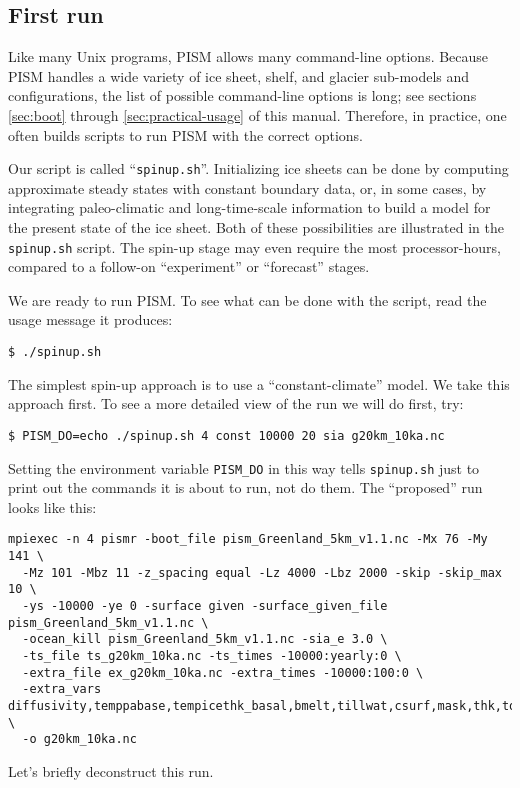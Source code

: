 \subsection{First run}   \label{subsect:runscript}  Like many Unix programs, PISM allows many command-line options.  Because PISM handles a wide variety of ice sheet, shelf, and glacier sub-models and configurations, the list of possible command-line options is long; see sections \ref{sec:boot} through \ref{sec:practical-usage} of this manual.  Therefore, in practice, one often builds scripts to run PISM with the correct options.

Our script is called ``\texttt{spinup.sh}''.  Initializing ice sheets can be done by computing approximate steady states with constant boundary data, or, in some cases, by integrating paleo-climatic and long-time-scale information to build a model for the present state of the ice sheet.  Both of these possibilities are illustrated in the \texttt{spinup.sh} script.  The spin-up stage may even require the most processor-hours, compared to a follow-on ``experiment'' or ``forecast'' stages.

We are ready to run PISM.  To see what can be done with the script, read the usage message it produces:
\begin{verbatim}
$ ./spinup.sh
\end{verbatim}

The simplest spin-up approach is to use a ``constant-climate'' model.  We take this approach first.  To see a more detailed view of the run we will do first, try:
\begin{verbatim}
$ PISM_DO=echo ./spinup.sh 4 const 10000 20 sia g20km_10ka.nc
\end{verbatim}
Setting the environment variable \texttt{PISM_DO} in this way tells \texttt{spinup.sh} just to print out the commands it is about to run, not do them.  The ``proposed'' run looks like this:
\small
\begin{verbatim}
mpiexec -n 4 pismr -boot_file pism_Greenland_5km_v1.1.nc -Mx 76 -My 141 \
  -Mz 101 -Mbz 11 -z_spacing equal -Lz 4000 -Lbz 2000 -skip -skip_max 10 \
  -ys -10000 -ye 0 -surface given -surface_given_file pism_Greenland_5km_v1.1.nc \
  -ocean_kill pism_Greenland_5km_v1.1.nc -sia_e 3.0 \
  -ts_file ts_g20km_10ka.nc -ts_times -10000:yearly:0 \
  -extra_file ex_g20km_10ka.nc -extra_times -10000:100:0 \
  -extra_vars diffusivity,temppabase,tempicethk_basal,bmelt,tillwat,csurf,mask,thk,topg,usurf \
  -o g20km_10ka.nc
\end{verbatim}
\normalsize
Let's briefly deconstruct this run.

